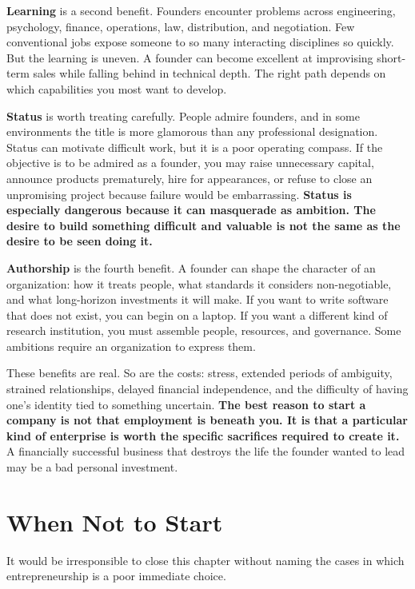 \textbf{Learning} is a second benefit. Founders encounter problems across engineering, psychology, finance, operations, law, distribution, and negotiation. Few conventional jobs expose someone to so many interacting disciplines so quickly. But the learning is uneven. A founder can become excellent at improvising short-term sales while falling behind in technical depth. The right path depends on which capabilities you most want to develop.

\textbf{Status} is worth treating carefully. People admire founders, and in some environments the title is more glamorous than any professional designation. Status can motivate difficult work, but it is a poor operating compass. If the objective is to be admired as a founder, you may raise unnecessary capital, announce products prematurely, hire for appearances, or refuse to close an unpromising project because failure would be embarrassing. \textbf{Status is especially dangerous because it can masquerade as ambition. The desire to build something difficult and valuable is not the same as the desire to be seen doing it.}

\textbf{Authorship} is the fourth benefit. A founder can shape the character of an organization: how it treats people, what standards it considers non-negotiable, and what long-horizon investments it will make. If you want to write software that does not exist, you can begin on a laptop. If you want a different kind of research institution, you must assemble people, resources, and governance. Some ambitions require an organization to express them.

These benefits are real. So are the costs: stress, extended periods of ambiguity, strained relationships, delayed financial independence, and the difficulty of having one's identity tied to something uncertain. \textbf{The best reason to start a company is not that employment is beneath you. It is that a particular kind of enterprise is worth the specific sacrifices required to create it.} A financially successful business that destroys the life the founder wanted to lead may be a bad personal investment.

\section{When Not to Start}
\label{sec:ch01-when-not-to-start}

It would be irresponsible to close this chapter without naming the cases in which entrepreneurship is a poor immediate choice.

